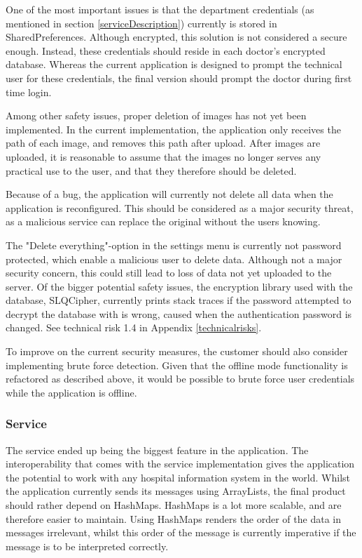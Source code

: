 One of the most important issues is that the department credentials (as mentioned in section \ref{serviceDescription}) currently is stored in SharedPreferences. Although encrypted, this  solution is not considered a secure enough. Instead, these credentials should reside in each doctor’s encrypted database. Whereas the current application is designed to prompt the technical user for these credentials, the final version should prompt the doctor during first time login. 

Among other safety issues, proper deletion of images has not yet been implemented. In the current implementation, the application only receives the path of each image, and removes this path after upload. After images are uploaded, it is reasonable to assume that the images no longer serves any practical use to the user, and that they therefore should be deleted. 

Because of a bug, the application will currently not delete all data when the application is reconfigured. This should be considered as a major security threat, as a malicious service can replace the original without the users knowing.

The "Delete everything"-option in the settings menu is currently not password protected, which enable a malicious user to delete data. Although not a major security concern, this could still lead to loss of data not yet uploaded to the server. Of the bigger potential safety issues, the encryption library used with the database, SLQCipher, currently prints stack traces if the password attempted to decrypt the database with is wrong, caused when the authentication password is changed. See technical risk 1.4 in Appendix \ref{technicalrisks}.

To improve on the current security measures, the customer should also consider implementing brute force detection. Given that the offline mode functionality is refactored as described above, it would be possible to brute force user credentials while the application is offline.


\subsubsection{Service}
The service ended up being the biggest feature in the application. The interoperability that comes with the service implementation gives the application the potential to work with any hospital information system in the world. Whilst the application currently sends its messages using ArrayLists, the final product should rather depend on HashMaps. HashMaps is a lot more scalable, and are therefore easier to maintain. Using HashMaps renders the order of the data in messages irrelevant, whilst this order of the message is currently imperative if the message is to be interpreted correctly. 

